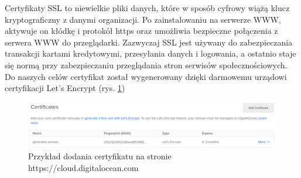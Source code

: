 Certyfikaty SSL to niewielkie pliki danych, które w sposób cyfrowy wiążą klucz kryptograficzny z danymi organizacji. Po zainstalowaniu na serwerze WWW, aktywuje on kłódkę i protokół https oraz umożliwia bezpieczne połączenia z serwera WWW do przeglądarki. Zazwyczaj SSL jest używany do zabezpieczania transakcji kartami kredytowymi, przesyłania danych i logowania, a ostatnio staje się normą przy zabezpieczaniu przeglądania stron serwisów społecznościowych.
Do naszych celów certyfikat został wygenerowany dzięki darmowemu urządowi certyfikacji Let's Encrypt (rys. \ref{fig:ssl})

\begin{figure}[H]
    \centering
    \includegraphics[width=6in]{images/ssl.png}
    \caption{Przykład dodania certyfikatu na stronie https://cloud.digitalocean.com \label{fig:ssl}}
\end{figure}